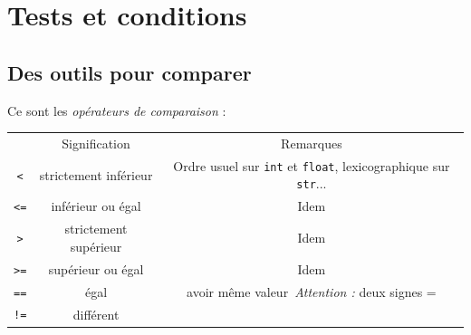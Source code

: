 \chapter{Tests et conditions}
\section{Des outils pour comparer}

Ce sont les \textit{opérateurs de comparaison} :\\

{\small
\tabularstyled
\begin{tabular}{CCC}
	 & {\boxfont\color{white} Signification} & {\boxfont\color{white} Remarques}                                                                     \\

	\texttt{<}                                       & strictement inférieur                 & Ordre usuel sur \texttt{int} et \texttt{float}, lexicographique sur \texttt{str}... \\

	\texttt{<=}                                      & inférieur ou égal                     & Idem                                                                                                  \\

	\texttt{>}                                       & strictement supérieur                 & Idem                                                                                                  \\

	\texttt{>=}                                      & supérieur ou égal                     & Idem                                                                                                  \\

	\texttt{==}                                      & égal                                  & \og avoir même valeur\fg\  \textit{Attention :} deux signes =                                         \\

	\texttt{!=}                                      & différent                             &                                                                                                       \\


\end{tabular}}
